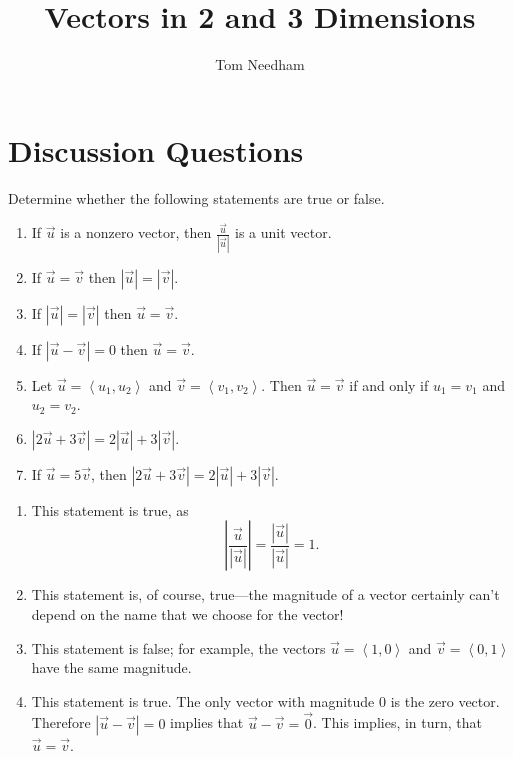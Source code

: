 \documentclass[]{ximera}
\author{Tom Needham}
\title[Collaborate:]{Vectors in 2 and 3 Dimensions}
\begin{document}
\begin{abstract}
\end{abstract}
\maketitle

\section{Discussion Questions}

\begin{problem}
Determine whether the following statements are true or false.
\begin{enumerate}[label=(\alph*)]
\item If $\vec{u}$ is a nonzero vector, then $\frac{\vec{u}}{\left|\vec{u}\right|}$ is a unit vector.
\item If $\vec{u} = \vec{v}$ then $\left|\vec{u}\right| = \left|\vec{v}\right|$.
\item If $\left|\vec{u}\right|  = \left|\vec{v}\right|$ then $\vec{u} = \vec{v}$. 
\item If $\left|\vec{u} - \vec{v}\right| = 0$ then $\vec{u} = \vec{v}$.
\item Let $\vec{u} = \left<u_1,u_2\right>$ and $\vec{v}=\left<v_1,v_2\right>$. Then $\vec{u} = \vec{v}$ if and only if $u_1 = v_1$ and $u_2 = v_2$. 
\item $\left|2\vec{u} + 3 \vec{v} \right| = 2 \left|\vec{u}\right| + 3 \left|\vec{v}\right|$. 
\item If $\vec{u} = 5 \vec{v}$, then $\left|2\vec{u} + 3 \vec{v} \right| = 2 \left|\vec{u}\right| + 3 \left|\vec{v}\right|$.
\end{enumerate}
\begin{solution}
\begin{enumerate}[label=(\alph*)]
\item This statement is true, as 
$$
\left| \frac{\vec{u}}{\left|\vec{u}\right|}\right| = \frac{\left|\vec{u}\right|}{\left|\vec{u}\right|} = 1.
$$
\item This statement is, of course, true---the magnitude of a vector certainly can't depend on the name that we choose for the vector!
\item This statement is false; for example, the vectors $\vec{u} = \left<1,0\right>$ and $\vec{v} = \left<0,1\right>$ have the same magnitude.
\item This statement is true. The only vector with magnitude $0$ is the zero vector. Therefore $\left|\vec{u} - \vec{v}\right| = 0$ implies that $\vec{u} - \vec{v} = \vec{0}$. This implies, in turn, that $\vec{u} = \vec{v}$.

\end{enumerate}
\end{solution}
\end{problem}
\end{document}
